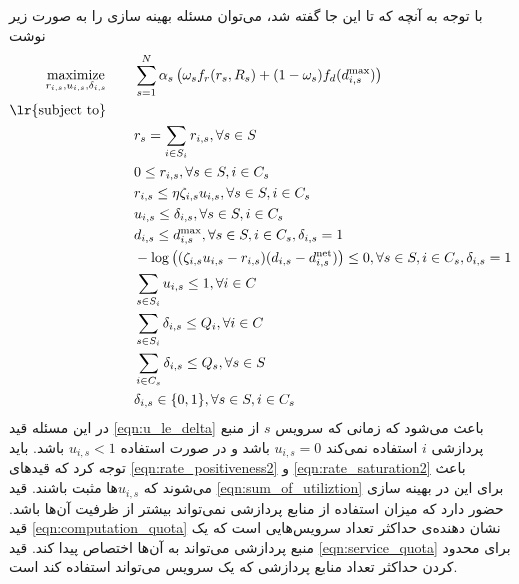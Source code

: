     با توجه به آنچه که تا این جا گفته شد،‌ می‌توان مسئله بهینه سازی را به صورت زیر نوشت
    \begin{subequations}\label{eqn:optimization2}
      \begin{align}
        \underset{r_{i,s}, u_{i,s}, \delta_{i,s}}{\text{maximize}} \qquad & \sum_{s=1}^N \alpha_s \left (\omega_s f_r(r_s, R_s) + (1-\omega_s) f_d(d_{i,s}^\text{max}) \right ) \\
        \text{\lr{subject  to}} \qquad & \nonumber \\
        & r_s = \sum_{i \in S_i} r_{i,s}, \forall s \in S \\
        & 0 \le r_{i,s}, \forall s \in S, i \in C_s \label{eqn:rate_positiveness2} \\
        & r_{i,s} \le \eta \zeta_{i,s} u_{i,s}, \forall s \in S, i \in C_s \label{eqn:rate_saturation2} \\
        & u_{i,s} \le \delta_{i,s}, \forall s \in S, i \in C_s \label{eqn:u_le_delta} \\
        & d_{i,s} \le d_{i,s}^\text{max}, \forall s \in S, i \in C_s, \delta_{i,s}=1 \\
        &- \log \left((\zeta_{i,s} u_{i,s} - r_{i,s}) (d_{i,s} - d_{i,s}^\text{net}) \right ) \le 0, \forall s \in S, i\in C_s, \delta_{i,s}=1 \\
        & \sum_{s \in S_i} u_{i,s} \le 1, \forall i \in C \label{eqn:sum_of_utiliztion} \\
        & \sum_{s \in S_i} \delta_{i,s} \le Q_i, \forall i \in C \label{eqn:computation_quota} \\
        & \sum_{i \in C_s} \delta_{i,s} \le Q_s, \forall s \in S \label{eqn:service_quota} \\
        & \delta_{i,s} \in \{0, 1\}, \forall s \in S, i \in C_s
      \end{align}
    \end{subequations}
    در این مسئله
    قید \eqref{eqn:u_le_delta} باعث می‌شود که زمانی که سرویس $s$ از منبع پردازشی $i$ استفاده نمی‌کند $u_{i,s}=0$ باشد و در صورت استفاده $u_{i,s}<1$ باشد.
    باید توجه کرد که قیدهای \cref{eqn:rate_positiveness2} و \cref{eqn:rate_saturation2} باعث می‌شوند که $u_{i,s}$ها مثبت باشند.
    قید \eqref{eqn:sum_of_utiliztion} برای این در بهینه سازی حضور دارد که میزان استفاده از منابع پردازشی نمی‌تواند بیشتر از ظرفیت آن‌ها باشد.
    قید \eqref{eqn:computation_quota} نشان دهنده‌ی حداکثر تعداد سرویس‌هایی است که یک منبع پردازشی می‌تواند به آن‌ها اختصاص پیدا کند.
    قید \eqref{eqn:service_quota} برای محدود کردن حداکثر تعداد منابع پردازشی که یک سرویس می‌تواند استفاده کند است.
    
